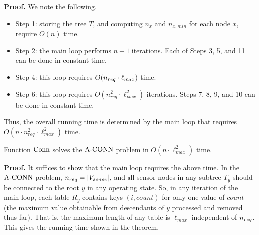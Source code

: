 \nwline
{\bf Proof.}
We note the following.
\begin{itemize}
\item   Step 1: storing the tree $T$, and computing $n_x$ and $n_{x,min}$
	for each node $x$, require $O(n)$ time.

\item	Step 2: the main loop performs $n-1$ iterations.
	Each of Steps 3, 5, and 11 can be done in constant time.

\item	Step 4: this loop requires $O({n_{req}} \cdot \ell_{max})$ time.

\item	Step 6: this loop requires $O(n_{req}^2 \cdot \ell_{max}^2)$ iterations.
	Steps 7, 8, 9, and 10 can be done in constant time.
\end{itemize}
Thus, the overall running time is determined by the main loop that
requires $O(n \cdot n_{req}^2  \cdot \ell_{max}^2)$ time.
\IEEEQED
%
\nwline
\begin{thm}
    Function ${\mathrm {Conn}}$ solves the ${\mathrm {A\mbox{-}CONN}}$ problem in
    $O(n \cdot \ell_{max}^2)$ time.

\end{thm}

\nwline
{\bf Proof.}
It suffices to show that the main loop requires the above time.
%
In the ${\mathrm {A\mbox{-}CONN}}$ problem, ${n_{req}}= |V_{sense}|$, and all sensor nodes
in any subtree $T_y$ should be connected to the root $y$ in any
operating state.
%
So, in any iteration of the main loop, each table $R_y$ contains keys
$(i,count)$ for only one value of $count$ (the maximum value obtainable
from descendants of $y$ processed and removed thus far).
%
That is, the maximum length of any table is $\ell_{max}$ independent
of ${n_{req}}$.
%
This gives the running time shown in the theorem. 
\IEEEQED

